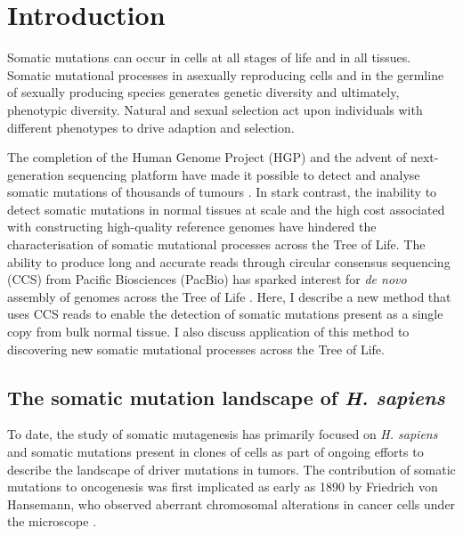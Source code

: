 
\chapter{Introduction}  %

\ifpdf
    \graphicspath{{Chapter1/Figs/Raster/}{Chapter1/Figs/PDF/}{Chapter1/Figs/}}
\else
    \graphicspath{{Chapter1/Figs/Vector/}{Chapter1/Figs/}}
\fi

Somatic mutations can occur in cells at all stages of life and in all tissues. Somatic mutational processes in asexually reproducing cells and in the germline of sexually producing species generates genetic diversity and ultimately, phenotypic diversity. Natural and sexual selection act upon individuals with different phenotypes to drive adaption and selection. 

The completion of the Human Genome Project (HGP) \cite{Lander2001-du} and the advent of next-generation sequencing platform \cite{Bentley2008-kl} have made it possible to detect and analyse somatic mutations of thousands of tumours \cite{Weinstein2013-ko, ICGCTCGA_Pan-Cancer_Analysis_of_Whole_Genomes_Consortium2020-ts}. In stark contrast, the inability to detect somatic mutations in normal tissues at scale and the high cost associated with constructing high-quality reference genomes have hindered the characterisation of somatic mutational processes across the Tree of Life. The ability to produce long and accurate reads through circular consensus sequencing (CCS) from Pacific Biosciences (PacBio) \cite{Wenger2019-pw} has sparked interest for \textit{de novo} assembly of genomes across the Tree of Life \cite{Darwin_Tree_of_Life_Project_Consortium2022-ma}. Here, I describe a new method that uses CCS reads to enable the detection of somatic mutations present as a single copy from bulk normal tissue. I also discuss application of this method to discovering new somatic mutational processes across the Tree of Life. 

\section{The somatic mutation landscape of \textit{H. sapiens}}

To date, the study of somatic mutagenesis has primarily focused on \textit{H. sapiens} and somatic mutations present in clones of cells as part of ongoing efforts to describe the landscape of driver mutations in tumors. The contribution of somatic mutations to oncogenesis was first implicated as early as 1890 by Friedrich von Hansemann, who observed aberrant chromosomal alterations in cancer cells under the microscope \cite{hansemann_1890}.

